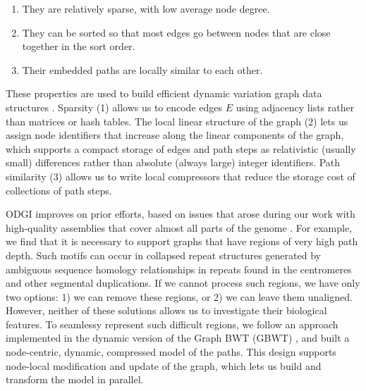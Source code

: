 \documentclass{bioinfo}
\newcommand{\red}[1]{{\textcolor{Red}{#1}}}
\newcommand{\FIXME}[1]{\red{[FIXME: #1]}}
\begin{document}
\begin{enumerate}
\item They are relatively sparse, with low average node degree.
\item They can be sorted so that most edges go between nodes that are close together in the sort order.
\item Their embedded paths are locally similar to each other.
\end{enumerate}

These properties are used to build efficient dynamic variation graph data structures \citep{Siren:2020,Eizenga_2020_BX}.
Sparsity (1) allows us to encode edges $E$ using adjacency lists rather than matrices or hash tables.
The local linear structure of the graph (2) lets us assign node identifiers that increase along the linear components of the graph, which supports a compact storage of edges and path steps as relativistic (usually small) differences rather than absolute (always large) integer identifiers.
Path similarity (3) allows us to write local compressors that reduce the storage cost of collections of path steps.

ODGI improves on prior efforts, based on issues that arose during our work with high-quality assemblies that cover almost all parts of the genome \citep{Logsdon_2021,Nurk_2021}.
For example, we find that it is necessary to support graphs that have regions of very high path depth.
Such motifs can occur in collapsed repeat structures generated by ambiguous sequence homology relationships in repeats found in the centromeres and other segmental duplications.
If we cannot process such regions, we have only two options: 1) we can remove these regions, or 2) we can leave them unaligned. However, neither of these solutions allows us to investigate their biological features.
To seamlessy represent such difficult regions, we follow an approach implemented in the dynamic version of the Graph BWT (GBWT) \citep{Siren:2020}, and built a node-centric, dynamic, compressed model of the paths.
This design supports node-local modification and update of the graph, which lets us build and transform the model in parallel.
\end{document}

